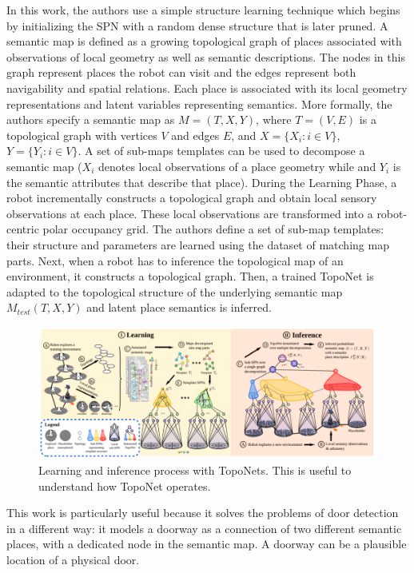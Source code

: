 In this work, the authors use a simple structure learning technique which begins by initializing the SPN with a random dense structure that is later pruned. A semantic map is defined as a growing topological graph of places associated with observations of local geometry as well as semantic descriptions. The nodes in this graph represent places the robot can visit and the edges represent both navigability and spatial relations. Each place is associated with its local geometry representations and latent variables representing semantics. More formally, the authors specify a semantic map as $ M = (T, X, Y)$, where $T = (V,E)$ is a topological graph with vertices $V$ and
edges $E$, and $X = \{X_i : i \in V \}$, $Y = \{Y_i : i \in V \}$. A set of sub-maps templates can be used to decompose a semantic map ($X_i$ denotes local observations of a place
geometry while and $Y_i$ is the semantic attributes that describe that place). During the Learning Phase, a robot incrementally constructs a topological graph and obtain local sensory observations at each place. These local observations are transformed into a robot-centric polar
occupancy grid. The authors define a set of sub-map templates: their structure and parameters are learned using the dataset of matching map parts. Next, when a robot has to inference the topological map of an environment, it constructs a topological graph. Then, a trained TopoNet is adapted to the topological structure of the underlying semantic map $M_{test}(T,X,Y )$ and latent
place semantics is inferred.

\begin{figure}[h!]
	\centering
	\includegraphics[width=0.8\linewidth]{images/SPN_training_inference.png}
	\caption{Learning and inference process with TopoNets. This is useful to understand how TopoNet operates.}
\end{figure}

\newpage

This work is particularly useful because it solves the problems of door detection in a different way: it models a doorway as a connection of two different semantic places, with a dedicated node in the semantic map. A doorway can be a plausible location of a physical door.

